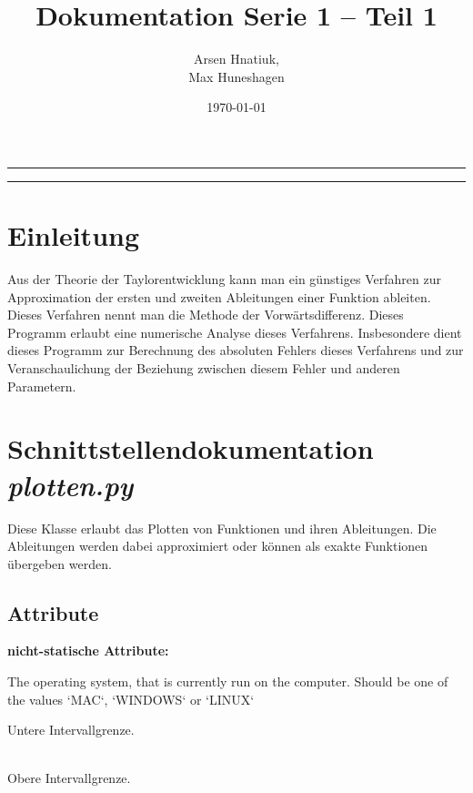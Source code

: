 \documentclass[smallheadings]{scrartcl}
\title{Dokumentation Serie 1 -- Teil 1}
\author{%
  Arsen Hnatiuk,\\%
  Max Huneshagen 
}
\date{\today}
\newcommand{\initem}[2]{\item[\hspace{0.5em} {\normalfont\ttfamily{#1}} {\normalfont\itshape{(#2)}}]}
\begin{document}
\maketitle
\tableofcontents
\bigskip

\hrule
\hrule


\section{Einleitung}

Aus der Theorie der Taylorentwicklung kann man ein günstiges Verfahren zur Approximation der ersten und zweiten Ableitungen einer Funktion ableiten. Dieses Verfahren nennt man die Methode der Vorwärtsdifferenz. Dieses Programm erlaubt eine numerische Analyse dieses Verfahrens. Insbesondere dient dieses Programm zur Berechnung des absoluten Fehlers dieses Verfahrens und zur Veranschaulichung der Beziehung zwischen diesem Fehler und anderen Parametern. 

\section{Schnittstellendokumentation \emph{plotten.py}}

Diese Klasse erlaubt das Plotten von Funktionen und ihren Ableitungen. Die Ableitungen werden dabei approximiert oder können als exakte Funktionen übergeben werden. 

\subsection{Attribute}

\textbf{nicht-statische Attribute:}\\

\begin{compactdesc}
	\initem{plotbereich}{pyplot.Axes-Objekt} The operating system, that is currently run on the computer.
                      Should be one of the values `MAC`, `WINDOWS` or `LINUX`
	      \initem{unten}{float} Untere Intervallgrenze.
	      \initem{oben}{float} ~\\ Obere Intervallgrenze.
\end{compactdesc}



\end{document}
